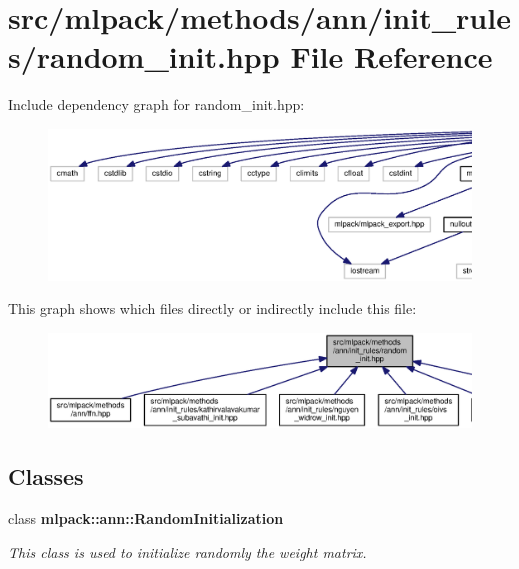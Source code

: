 \section{src/mlpack/methods/ann/init\+\_\+rules/random\+\_\+init.hpp File Reference}
\label{ann_2init__rules_2random__init_8hpp}
Include dependency graph for random\+\_\+init.\+hpp\+:
\nopagebreak
\begin{figure}[H]
\begin{center}
\leavevmode
\includegraphics[width=350pt]{ann_2init__rules_2random__init_8hpp__incl}
\end{center}
\end{figure}
This graph shows which files directly or indirectly include this file\+:
\nopagebreak
\begin{figure}[H]
\begin{center}
\leavevmode
\includegraphics[width=350pt]{ann_2init__rules_2random__init_8hpp__dep__incl}
\end{center}
\end{figure}
\subsection*{Classes}
\begin{DoxyCompactItemize}
\item 
class {\bf mlpack\+::ann\+::\+Random\+Initialization}
\begin{DoxyCompactList}\small\item\em This class is used to initialize randomly the weight matrix. \end{DoxyCompactList}\end{DoxyCompactItemize}
